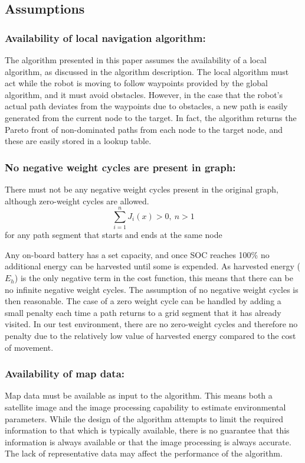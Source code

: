 \documentclass[journal]{IEEEtran}
\begin{document}
\subsection{Assumptions}
\subsubsection{Availability of local navigation algorithm:} The algorithm presented in this paper assumes the availability of a local algorithm, as discussed in the algorithm description. 
The local algorithm must act while the robot is moving to follow waypoints provided by the global algorithm, and it must avoid obstacles. 
However, in the case that the robot's actual path deviates from the waypoints due to obstacles, a new path is easily generated from the current node to the target. 
In fact, the algorithm returns the Pareto front of non-dominated paths from each node to the target node, and these are easily stored in a lookup table. 

\subsubsection{No negative weight cycles are present in graph:}
There must not be any negative weight cycles present in the original graph, although zero-weight cycles are allowed.
\begin{equation}
\sum_{i=1}^n J_i(x) > 0,\ n>1
\end{equation}
for any path segment that starts and ends at the same node

Any on-board battery has a set capacity, and once SOC reaches 100\% no additional energy can be harvested until some is expended. 
As harvested energy ($E_h$) is the only negative term in the cost function, this means that there can be no infinite negative weight cycles. 
The assumption of no negative weight cycles is then reasonable. 
The case of a zero weight cycle can be handled by adding a small penalty each time a path returns to a grid segment that it has already visited.
In our test environment, there are no zero-weight cycles and therefore no penalty due to the relatively low value of harvested energy compared to the cost of movement.

\subsubsection{Availability of map data:}
Map data must be available as input to the algorithm. 
This means both a satellite image and the image processing capability to estimate environmental parameters. 
While the design of the algorithm attempts to limit the required information to that which is typically available, there is no guarantee that this information is always available or that the image processing is always accurate. The lack of representative data may affect the performance of the algorithm.
\end{document}

